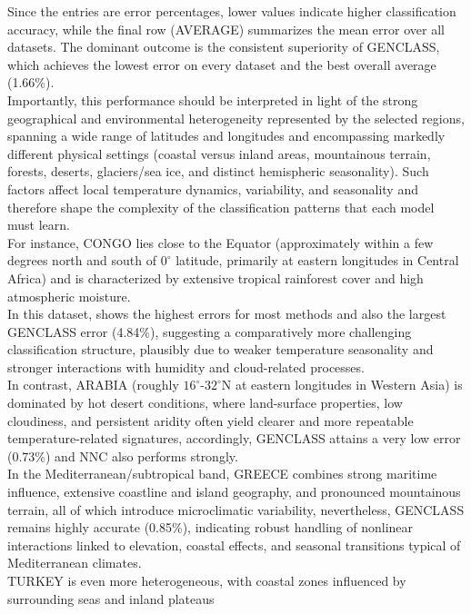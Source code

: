 \documentclass[12pt]{Definitions/academia}
\begin{document}
Since the entries are error percentages, lower values indicate
higher classification accuracy, while the final row (AVERAGE) summarizes
the mean error over all datasets. The dominant outcome is the consistent
superiority of GENCLASS, which achieves the lowest error on every
dataset and the best overall average (1.66\%).\\
 Importantly, this performance
should be interpreted in light of the strong geographical and environmental
heterogeneity represented by the selected regions, spanning a wide
range of latitudes and longitudes and encompassing markedly different
physical settings (coastal versus inland areas, mountainous terrain,
forests, deserts, glaciers/sea ice, and distinct hemispheric seasonality).
Such factors affect local temperature dynamics, variability, and seasonality
and therefore shape the complexity of the classification patterns
that each model must learn.\\
 For instance, CONGO lies close to the
Equator (approximately within a few degrees north and south of $0^\circ$
latitude, primarily at eastern longitudes in Central Africa) and is
characterized by extensive tropical rainforest cover and high atmospheric
moisture. \\
In this dataset,
shows the highest errors for most methods and also the largest GENCLASS
error (4.84\%), suggesting a comparatively more challenging classification
structure, plausibly due to weaker temperature seasonality and stronger
interactions with humidity and cloud-related processes.\\
 In contrast,
ARABIA (roughly $16^\circ$-$32^\circ$N at eastern longitudes in Western Asia) is
dominated by hot desert conditions, where land-surface properties,
low cloudiness, and persistent aridity often yield clearer and more
repeatable temperature-related signatures, accordingly, GENCLASS attains
a very low error (0.73\%) and NNC also performs strongly.\\
 In the Mediterranean/subtropical
band, GREECE combines strong maritime
influence, extensive coastline and island geography, and pronounced
mountainous terrain, all of which introduce microclimatic variability,
nevertheless, GENCLASS remains highly accurate (0.85\%), indicating
robust handling of nonlinear interactions linked to elevation, coastal
effects, and seasonal transitions typical of Mediterranean climates.\\
TURKEY  is even more heterogeneous,
with coastal zones influenced by surrounding seas and inland plateaus
\end{document}
